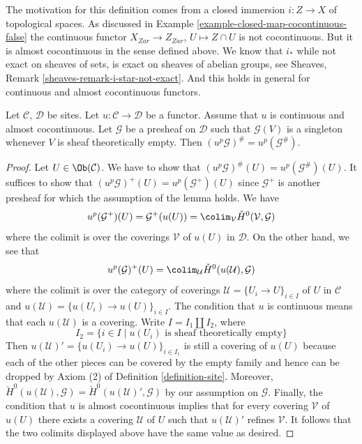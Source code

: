 \noindent
The motivation for this definition comes from a closed immersion
$i : Z \to X$ of topological spaces. As discussed in
Example \ref{example-closed-map-cocontinuous-false}
the continuous functor
$X_{Zar} \to Z_{Zar}$, $U \mapsto Z \cap U$ is
not cocontinuous. But it is almost cocontinuous in the sense defined above.
We know that $i_*$ while not exact on sheaves of sets, is
exact on sheaves of abelian groups, see
Sheaves, Remark \ref{sheaves-remark-i-star-not-exact}.
And this holds in general for continuous and almost cocontinuous functors.

\begin{lemma}
\label{lemma-almost-cocontinuous-sheafification}
Let $\mathcal{C}$, $\mathcal{D}$ be sites.
Let $u : \mathcal{C} \to \mathcal{D}$ be a functor.
Assume that $u$ is continuous and almost cocontinuous.
Let $\mathcal{G}$ be a presheaf on $\mathcal{D}$ such that $\mathcal{G}(V)$ is
a singleton whenever $V$ is sheaf theoretically empty.
Then $(u^p\mathcal{G})^\# = u^p(\mathcal{G}^\#)$.
\end{lemma}

\begin{proof}
Let $U \in \Ob(\mathcal{C})$. We have to show that
$(u^p\mathcal{G})^\#(U) = u^p(\mathcal{G}^\#)(U)$.
It suffices to show that
$(u^p\mathcal{G})^+(U) = u^p(\mathcal{G}^+)(U)$
since $\mathcal{G}^+$ is another presheaf for which the
assumption of the lemma holds. We have
$$
u^p(\mathcal{G}^+)(U) =
\mathcal{G}^+(u(U)) =
\colim_\mathcal{V} \check H^0(\mathcal{V}, \mathcal{G})
$$
where the colimit is over the coverings $\mathcal{V}$ of $u(U)$ in
$\mathcal{D}$. On the other hand, we see that
$$
u^p(\mathcal{G})^+(U) =
\colim_\mathcal{U} \check H^0(u(\mathcal{U}), \mathcal{G})
$$
where the colimit is over the category of coverings
$\mathcal{U} = \{U_i \to U\}_{i \in I}$ of $U$ in $\mathcal{C}$ and
$u(\mathcal{U}) = \{u(U_i) \to u(U)\}_{i \in I}$. The condition
that $u$ is continuous means that each $u(\mathcal{U})$ is a covering.
Write $I = I_1 \amalg I_2$, where
$$
I_2 = \{i \in I \mid u(U_i)\text{ is sheaf theoretically empty}\}
$$
Then $u(\mathcal{U})' = \{u(U_i) \to u(U)\}_{i \in I_1}$ is still a covering of $u(U)$
because each of the other pieces can be covered by the empty family
and hence can be dropped by Axiom (2) of
Definition \ref{definition-site}.
Moreover,
$\check H^0(u(\mathcal{U}), \mathcal{G}) =
\check H^0(u(\mathcal{U})', \mathcal{G})$
by our assumption on $\mathcal{G}$. Finally, the condition that $u$ is
almost cocontinuous implies that for every covering $\mathcal{V}$
of $u(U)$ there exists a covering $\mathcal{U}$ of $U$ such that
$u(\mathcal{U})'$ refines $\mathcal{V}$. It follows that the two colimits
displayed above have the same value as desired.
\end{proof}

